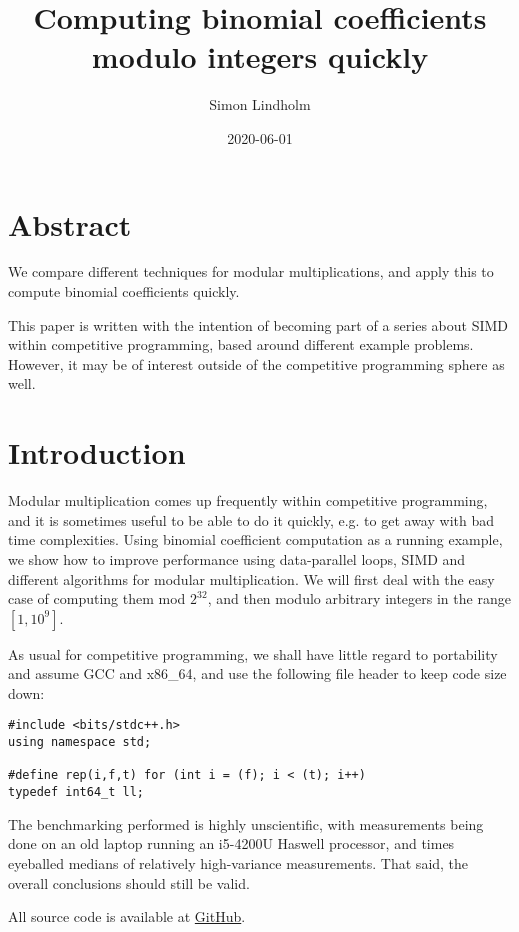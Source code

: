 \documentclass{article}
\title{Computing binomial coefficients modulo integers quickly}
\author{Simon Lindholm}
\date{2020-06-01}
\begin{document}
\maketitle

\section*{Abstract}
We compare different techniques for modular multiplications, and apply this to compute binomial coefficients quickly.

This paper is written with the intention of becoming part of a series about SIMD within competitive programming, based around different example problems.
However, it may be of interest outside of the competitive programming sphere as well.

\tableofcontents

\section{Introduction}

Modular multiplication comes up frequently within competitive programming,
and it is sometimes useful to be able to do it quickly, e.g. to get away
with bad time complexities.
Using binomial coefficient computation as a running example, we show how
to improve performance using data-parallel loops, SIMD and different
algorithms for modular multiplication.
We will first deal with the easy case of computing them mod $2^{32}$, and
then modulo arbitrary integers in the range $[1, 10^9]$.

As usual for competitive programming, we shall have
little regard to portability and assume GCC and x86\_64,
and use the following file header to keep code size down:

\begin{lstlisting}
#include <bits/stdc++.h>
using namespace std;

#define rep(i,f,t) for (int i = (f); i < (t); i++)
typedef int64_t ll;
\end{lstlisting}

The benchmarking performed is highly unscientific,
with measurements being done on an old laptop running an i5-4200U Haswell processor,
and times eyeballed medians of relatively high-variance measurements.
That said, the overall conclusions should still be valid.

All source code is available at \href{https://github.com/simonlindholm/simd-book/tree/master/binomial-coefficients}{GitHub}.




\end{document}

